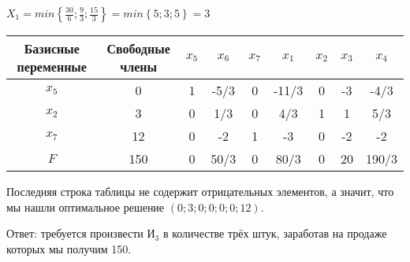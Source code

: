 \documentclass[12pt]{article}
\begin{document}
$X_1 = min\left\{ \frac{30}{6};\frac{9}{3};\frac{15}{3} \right\} = min\left\{ 5; 3; 5 \right\} = 3$
\begin{table}[h!]
\begin{center}
\begin{tabular}{|c|c|c|c|c|c|c|c|c|}
\hline
Базисные переменные & Свободные члены & $x_5$ & $x_6$ & $x_7$ & $x_1$ & $x_2$ & $x_3$  & $x_4$ \\
\hline
		$x_5$	  & 		0 		 & 	1    &  -5/3   &     0    & -11/3  &     0    &    -3    &  -4/3     \\
\hline
		$x_2$	  & 		3 		 & 	0    &   1/3   &     0    &   4/3   &     1    &     1    &   5/3     \\
\hline
		$x_7$	  & 		12		 & 	0    &    -2    &    1    &     -3    &     0    &    -2    &    -2    \\
\hline
	         $F$		  & 		150		 & 	0    &    50/3    &    0    &   80/3   &     0    &   20   &  190/3    \\
\hline
\end{tabular}
\end{center}
\end{table} 

Последняя строка таблицы не содержит отрицательных элементов, а значит, что мы нашли оптимальное решение $(0; 3; 0; 0; 0; 0; 12)$.

Ответ: требуется произвести $И_3$ в количестве трёх штук, заработав на продаже которых мы получим 150.
\end{document}
